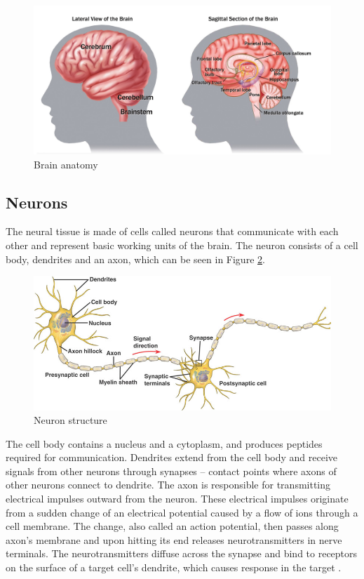 \begin{figure}[htb]
	\centering
	\includegraphics[width=1\linewidth]{fig/BrainAnatomy.jpg}
	\caption[Caption for LOF]{Brain anatomy\protect\footnotemark}
	\label{fig:brainAnatomy}
\end{figure}

\subsection{Neurons}
The neural tissue is made of cells called neurons that communicate with each
other and represent basic working units of the brain.
The neuron consists of a cell body, dendrites and an axon, which can be seen in Figure \ref{fig:neuron}.
\begin{figure}[htb]
	\centering
	\includegraphics[width=0.8\linewidth]{fig/neuron2.jpg}
	\caption[Caption for LOF]{Neuron structure\protect\footnotemark}
	\label{fig:neuron}
\end{figure}
The cell body contains a nucleus and a cytoplasm, and
produces peptides required for communication. Dendrites extend from the cell body and
receive signals from other neurons through synapses -- contact points where
axons of other neurons connect to dendrite. The axon is responsible for transmitting
electrical impulses outward from the neuron. These electrical impulses originate
from a sudden change of an electrical potential caused by a flow of ions through a cell
membrane. The change, also called an action potential, then passes along axon's
membrane and upon hitting its end releases neurotransmitters in nerve terminals.
The neurotransmitters diffuse across the synapse and bind to receptors on the surface
of a target cell's dendrite, which causes response in the target \cite{brainFacts}.

